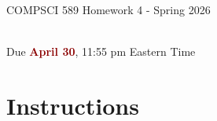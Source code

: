\documentclass{article}
\begin{document}
\newpage
\vspace*{1cm}
\begin{center}
    \begin{Large}
    COMPSCI 589 Homework 4 - Spring 2026
    \end{Large}
    \\
    \vspace{0.15cm}
    Due \textcolor{darkred}{\textbf{April 30}}, 11:55 pm Eastern Time
\end{center}







\vspace{0.5cm}
\section*{Instructions}
\vspace{0.5cm}
\end{document}
